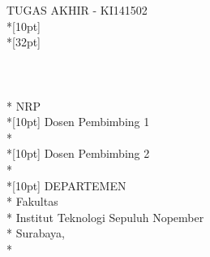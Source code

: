 \newpage

	\sffamily
	\thispagestyle{empty}
	{ \noindent TUGAS AKHIR - KI141502 }\\*[10pt] 
	{\large\textbf{\MakeUppercase{\judul}}} \\*[32pt]
	\\
	\\
	\\
	\MakeUppercase{\penulis} \\*
	NRP \nrp \\*[10pt]
	Dosen Pembimbing 1 \\*
	\pembimbingSatu \\*[10pt]
	Dosen Pembimbing 2 \\*
	\pembimbingDua \\*[10pt]
	DEPARTEMEN \MakeUppercase{\jurusan} \\*
	Fakultas \fakultas \\*
	Institut Teknologi Sepuluh Nopember \\*
	Surabaya, \tahun \\*
	\rmfamily
	\normalsize
	\restoregeometry
	\color{black}
	\cleardoublepage


